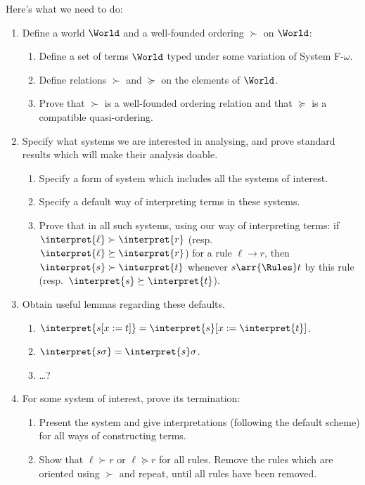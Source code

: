 Here's what we need to do:
\begin{enumerate}
\item Define a world $\World$ and a well-founded ordering $\succ$ on
  $\World$:
  \begin{enumerate}
  \item Define a set of terms $\World$ typed under some variation of
    System F-$\omega$.
  \item Define relations $\succ$ and $\succeq$ on the elements of $\World$.
  \item Prove that $\succ$ is a well-founded ordering relation and that
    $\succeq$ is a compatible quasi-ordering.
  \end{enumerate}
\item Specify what systems we are interested in analysing, and prove
  standard results which will make their analysis doable.
  \begin{enumerate}
  \item Specify a form of system which includes all the systems of interest.
  \item Specify a default way of interpreting terms in these systems.
  \item Prove that in all such systems, using our way of interpreting
    terms: if $\interpret{\ell} \succ \interpret{r}$ (resp.\ $\interpret{
    \ell} \succeq \interpret{r}$) for a rule  $\ell \to r$, then
    $\interpret{s} \succ \interpret{t}$ whenever $s \arr{\Rules} t$ by
    this rule (resp.\ $\interpret{s} \succeq \interpret{t}$).
  \end{enumerate}
\item Obtain useful lemmas regarding these defaults.
  \begin{enumerate}
  \item $\interpret{s[x:=t]} = \interpret{s}[x:=\interpret{t}]$.
  \item $\interpret{s\sigma} = \interpret{s}\sigma$.
  \item \dots?
  \end{enumerate}
\item For some system of interest, prove its termination:
  \begin{enumerate}
  \item Present the system and give interpretations (following the
    default scheme) for all ways of constructing terms.
  \item Show that $\ell \succ r$ or $\ell \succeq r$ for all rules.
    Remove the rules which are oriented using $\succ$ and repeat,
    until all rules have been removed.
  \end{enumerate}
\end{enumerate}

